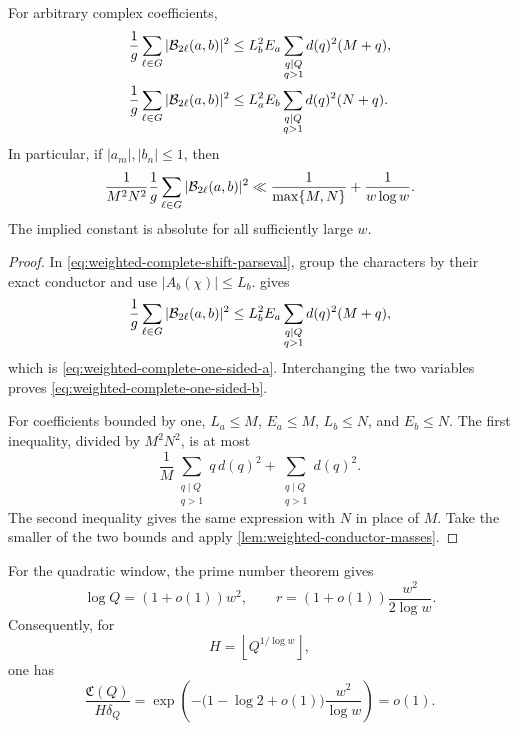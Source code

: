 \begin{theorem}
\label{thm:weighted-complete-shift}
For arbitrary complex coefficients,
\begin{align}
 \frac1g\sum_{\ell\in G}|\mathcal B_{2\ell}(a,b)|^2
 &\leq
 L_b^2E_a
 \sum_{\substack{q\mid Q\\q>1}}d(q)^2(M+q),
 \label{eq:weighted-complete-one-sided-a}\\
 \frac1g\sum_{\ell\in G}|\mathcal B_{2\ell}(a,b)|^2
 &\leq
 L_a^2E_b
 \sum_{\substack{q\mid Q\\q>1}}d(q)^2(N+q).
 \label{eq:weighted-complete-one-sided-b}
\end{align}
In particular, if $|a_m|,|b_n|\leq1$, then
\begin{equation}\label{eq:weighted-complete-bounded-coefficients}
 \frac1{M^2N^2}
 \frac1g\sum_{\ell\in G}|\mathcal B_{2\ell}(a,b)|^2
 \ll
 \frac1{\max\{M,N\}}+\frac1{w\log w}.
\end{equation}
The implied constant is absolute for all sufficiently large $w$.
\end{theorem}

\begin{proof}
In \eqref{eq:weighted-complete-shift-parseval}, group the characters by
their exact conductor and use $|A_b(\chi)|\leq L_b$.
 gives
\[
 \frac1g\sum_{\ell\in G}|\mathcal B_{2\ell}(a,b)|^2
 \leq L_b^2E_a
 \sum_{\substack{q\mid Q\\q>1}}d(q)^2(M+q),
\]
which is \eqref{eq:weighted-complete-one-sided-a}.  Interchanging the two
variables proves \eqref{eq:weighted-complete-one-sided-b}.

For coefficients bounded by one, $L_a\leq M$, $E_a\leq M$,
$L_b\leq N$, and $E_b\leq N$.  The first inequality, divided by
$M^2N^2$, is at most
\[
 \frac1M\sum_{\substack{q\mid Q\\q>1}}q\,d(q)^2
 +\sum_{\substack{q\mid Q\\q>1}}d(q)^2.
\]
The second inequality gives the same expression with $N$ in place of $M$.
Take the smaller of the two bounds and apply
\cref{lem:weighted-conductor-masses}.
\end{proof}

For the quadratic window, the prime number theorem gives
\begin{equation}\label{eq:weighted-logQ-r-asymptotics}
 \log Q=(1+o(1))w^2,
 \qquad
 r=(1+o(1))\frac{w^2}{2\log w}.
\end{equation}
Consequently, for
\begin{equation}\label{eq:weighted-short-H-choice}
 H=\left\lfloor Q^{1/\log w}\right\rfloor,
\end{equation}
one has
\begin{equation}\label{eq:weighted-completion-decay}
 \frac{\mathfrak C(Q)}{H\delta_Q}
 =\exp\left(
  -\bigl(1-\log2+o(1)\bigr)\frac{w^2}{\log w}
 \right)=o(1).
\end{equation}

